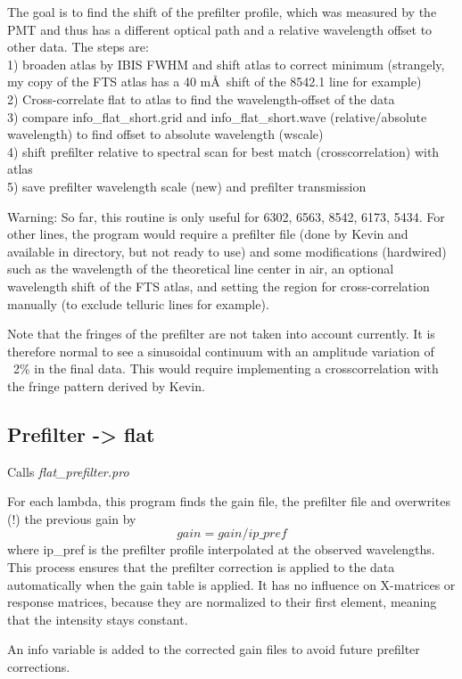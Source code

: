 \documentclass[a4paper,11pt]{article}
\begin{document}
The goal is to find the shift of the prefilter profile, which was measured by the PMT and thus has a different optical path and a relative wavelength offset to other data. The steps are:\\
1) broaden atlas by IBIS FWHM and shift atlas to correct minimum (strangely, my copy of the FTS atlas has a 40 m\AA\ shift of the 8542.1 line for example)\\
2) Cross-correlate flat to atlas to find the wavelength-offset of the data\\
3) compare info\_flat\_short.grid and info\_flat\_short.wave (relative/absolute wavelength) to find offset to absolute wavelength (wscale)\\
4) shift prefilter relative to spectral scan for best match (crosscorrelation) with atlas\\
5) save prefilter wavelength scale (new) and prefilter transmission

Warning: So far, this routine is only useful for 6302, 6563, 8542, 6173, 5434. For other lines, the program would require a prefilter file (done by Kevin and available in directory, but not ready to use) and some modifications (hardwired) such as the wavelength of the theoretical line center in air, an optional wavelength shift of the FTS atlas, and setting the region for cross-correlation manually (to exclude telluric lines for example).

Note that the fringes of the prefilter are not taken into account currently. It is therefore normal to see a sinusoidal continuum with an amplitude variation of ~2\% in the final data. This would require implementing a crosscorrelation with the fringe pattern derived by Kevin.

\subsection{Prefilter -> flat}
Calls \textit{flat\_prefilter.pro}

For each lambda, this program finds the gain file, the prefilter file and overwrites (!) the previous gain by
$$gain = gain / ip\_pref $$ where ip\_pref is the prefilter profile interpolated at the observed wavelengths.
This process ensures that the prefilter correction is applied to the data automatically when the gain table is applied. It has no influence on X-matrices or response matrices, because they are normalized to their first element, meaning that the intensity stays constant.

An info variable is added to the corrected gain files to avoid future prefilter corrections.
\end{document}
